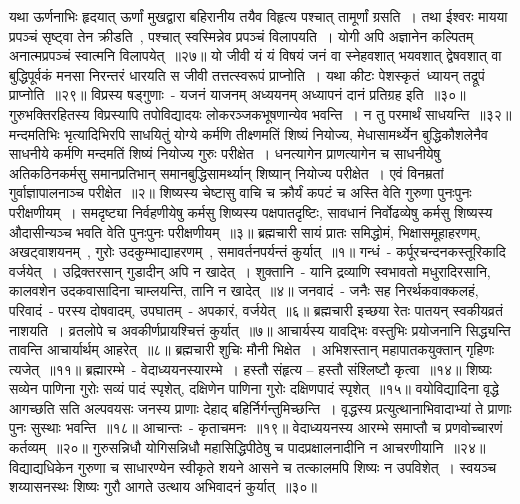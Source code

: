 \indent  यथा ऊर्णनाभिः हृदयात् ऊर्णां मुखद्वारा बहिरानीय तयैव विहृत्य पश्चात् तामूर्णां ग्रसति~। तथा ईश्वरः मायया  प्रपञ्चं सृष्ट्वा तेन क्रीडति~, पश्चात्  स्वस्मिन्नेव प्रपञ्चं विलापयति~। योगी अपि अज्ञानेन कल्पितम् अनात्मप्रपञ्चं  स्वात्मनि विलापयेत्~॥२७॥
\indent  यो जीवी यं यं विषयं जनं वा स्नेहवशात् भयवशात् द्वेषवशात् वा बुद्धिपूर्वकं मनसा निरन्तरं धारयति स  जीवी तत्तत्स्वरूपं प्राप्नोति~। यथा कीटः पेशस्कृतं\footB\ ध्यायन् तद्रूपं प्राप्नोति~॥२९॥
\indent विप्रस्य षड्‌गुणाः~- यजनं याजनम् अध्ययनम् अध्यापनं दानं प्रतिग्रह इति~॥३०॥
\indent गुरुभक्तिरहितस्य विप्रस्यापि तपोविद्यादयः लोकरञ्जकभूषणान्येव भवन्ति~। न तु परमार्थं साधयन्ति~॥३२॥
\indent मन्दमतिभिः भृत्यादिभिरपि साधयितुं योग्ये कर्मणि तीक्ष्णमतिं शिष्यं नियोज्य, मेधासामर्थ्येन बुद्धिकौशलेनैव साधनीये कर्मणि मन्दमतिं शिष्यं नियोज्य गुरुः परीक्षेत~। धनत्यागेन प्राणत्यागेन च साधनीयेषु अतिकठिनकर्मसु समानप्रतिभान् समानबुद्धिसामर्थ्यान् शिष्यान् नियोज्य परीक्षेत~। एवं विनम्रतां गुर्वाज्ञापालनाञ्च परीक्षेत~॥२॥
\indent शिष्यस्य चेष्टासु वाचि च क्रौर्यं कपटं च  अस्ति वेति गुरुणा पुनःपुनः परीक्षणीयम्~। समदृष्ट्या निर्वहणीयेषु कर्मसु  शिष्यस्य पक्षपातदृष्टिः, सावधानं निर्वोढव्येषु कर्मसु  शिष्यस्य औदासीन्यञ्च  भवति वेति पुनःपुनः परीक्षणीयम्~॥३॥
\indent  ब्रह्मचारी सायं प्रातः समिद्धोमं, भिक्षासमूहाहरणम्, अखट्वाशयनम्\footB\ , गुरोः उदकुम्भाद्याहरणम्~, समावर्तनपर्यन्तं कुर्यात्~॥१॥
\indent  गन्धं~- कर्पूरचन्दनकस्तूरिकादि वर्जयेत्~। उद्रिक्तरसान् गुडादीन् अपि न खादेत्~। शुक्तानि~- यानि द्रव्याणि स्वभावतो मधुरादिरसानि, कालवशेन उदकवासादिना चाम्लयन्ति, तानि न खादेत्~॥४॥
\indent  जनवादं~- जनैः सह निरर्थकवाक्कलहं, परिवादं~- परस्य दोषवादम्, उपघातम्~- अपकारं, वर्जयेत्~॥६॥
\indent  ब्रह्मचारी इच्छया रेतः पातयन् स्वकीयव्रतं  नाशयति~। व्रतलोपे च अवकीर्णप्रायश्चित्तं कुर्यात्~॥७॥
\indent  आचार्यस्य यावद्भिः वस्तुभिः प्रयोजनानि सिद्ध्यन्ति तावन्ति आचार्यार्थम्  आहरेत्~॥८॥
\indent  ब्रह्मचारी शुचिः मौनी भिक्षेत~। अभिशस्तान् महापातकयुक्तान् गृहिणः त्यजेत्~॥११॥
\indent  ब्रह्मारम्भे~- वेदाध्ययनस्यारम्भे~। हस्तौ संहृत्य – हस्तौ संश्लिष्टौ कृत्वा~॥१४॥
\indent   शिष्यः सव्येन पाणिना गुरोः सव्यं पादं स्पृशेत्, दक्षिणेन पाणिना गुरोः दक्षिणपादं स्पृशेत्~॥१५॥
\indent  वयोविद्यादिना वृद्धे आगच्छति सति अल्पवयसः जनस्य प्राणाः देहाद् बहिर्निर्गन्तुमिच्छन्ति~। वृद्धस्य प्रत्युत्थानाभिवादाभ्यां ते प्राणाः पुनः सुस्थाः भवन्ति~॥१८॥
\indent  आचान्तः~- कृताचमनः~॥१९॥
\indent  वेदाध्ययनस्य आरम्भे समाप्तौ च प्रणवोच्चारणं कर्तव्यम्~॥२०॥
\indent  गुरुसन्निधौ योगिसन्निधौ महासिद्धिपीठेषु च  पादप्रक्षालनादीनि न आचरणीयानि~॥२४॥
\indent  विद्याद्यधिकेन गुरुणा च साधारण्येन स्वीकृते शयने आसने च तत्कालमपि शिष्यः न उपविशेत्~। स्वयञ्च शय्यासनस्थः शिष्यः गुरौ आगते उत्थाय अभिवादनं कुर्यात्~॥३०॥
